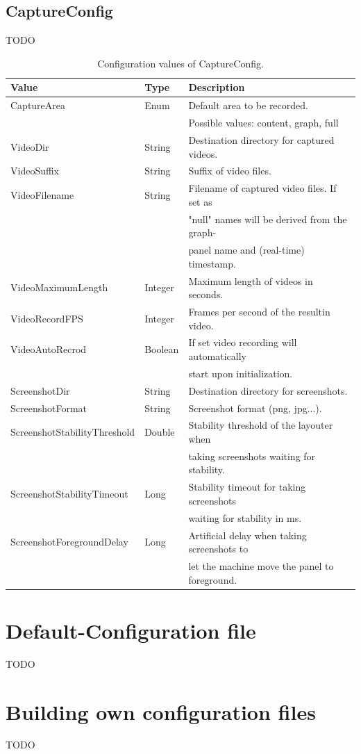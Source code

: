 \subsection{CaptureConfig}
\label{ss:captureConfig}
TODO

\begin{table}[h]
\centering
\begin{tabular}[h]{|l|l|l|}\hline
	\textbf{Value} & \textbf{Type} & \textbf{Description}\\
	\hline
	CaptureArea & Enum & Default area to be recorded.\\
	& & Possible values: content, graph, full\\
	\hline
	VideoDir & String & Destination directory for captured videos.\\
	\hline
	VideoSuffix & String & Suffix of video files.\\
	\hline
	VideoFilename & String & Filename of captured video files. If set as\\
	& & "null" names will be derived from the graph-\\
	& & panel name and (real-time) timestamp.\\
	\hline
	VideoMaximumLength & Integer & Maximum length of videos in seconds.\\
	\hline
	VideoRecordFPS & Integer & Frames per second of the resultin video.\\
	\hline
	VideoAutoRecrod & Boolean & If set video recording will automatically\\
	& & start upon initialization.\\
	\hline
	ScreenshotDir & String & Destination directory for screenshots.\\
	\hline
	ScreenshotFormat & String & Screenshot format (png, jpg...).\\
	\hline
	ScreenshotStabilityThreshold & Double & Stability threshold of the layouter when\\
	& & taking screenshots waiting for stability.\\
	\hline
	ScreenshotStabilityTimeout & Long & Stability timeout for taking screenshots\\
	& & waiting for stability in ms.\\
	\hline
	ScreenshotForegroundDelay & Long & Artificial delay when taking screenshots to\\
	& & let the machine move the panel to foreground.\\
	\hline
\end{tabular}
\caption{Configuration values of CaptureConfig.}
\label{tab:captureConfigValues}
\end{table}

\section{Default-Configuration file}
TODO

\section{Building own configuration files}
TODO